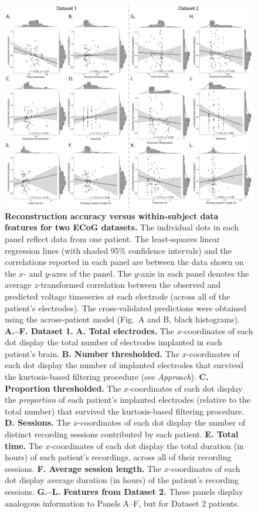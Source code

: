 \documentclass[10pt]{article}
\begin{document}
\begin{figure}[p]
\centering \includegraphics[width=\textwidth]{figs/supplemental_6}
\caption{\textbf{Reconstruction accuracy versus within-subject data features for
two ECoG datasets.} The individual dots in each panel  reflect data from one
patient.  The least-squares linear regression lines (with shaded 95\% confidence
intervals) and the correlations reported in each panel are between the data
shown on the $x$- and $y$-axes of the panel.  The $y$-axis in each panel
denotes the average $z$-transformed correlation between the observed and
predicted voltage timeseries at each electrode (across all of the patient's
electrodes). The cross-validated predictions were obtained using the
across-patient model (Fig.~\corrmaps A and B, black histograms).  \textbf{A.--F.
Dataset 1.}  \textbf{A. Total electrodes.}  The $x$-coordinates of each dot
display the total number of electrodes implanted in each patient's brain.
\textbf{B. Number thresholded.}  The $x$-coordinates of each dot display the
number of implanted electrodes that survived the kurtosis-based filtering
procedure (see \textit{Approach}).  \textbf{C. Proportion thresholded.} The
$x$-coordinates of each dot display the \textit{proportion} of each patient's
implanted electrodes (relative to the total number) that survived the
kurtosis-based filtering procedure.  \textbf{D. Sessions.}  The $x$-coordinates of each dot display the
number of distinct recording sessions contributed by each patient.  \textbf{E. Total time.} The $x$-coordinates of each dot display the
total duration (in hours) of each patient's recordings, across all of their recording sessions.  \textbf{F. Average session length.} The $x$-coordinates of each dot display average duration (in hours) of the patient's recording sessions.
  \textbf{G.--L. Features from Dataset 2.}  These panels display analogous information to Panels A--F, but for Dataset 2 patients.}
\label{fig:supplemental_6}
\end{figure}
\end{document}
